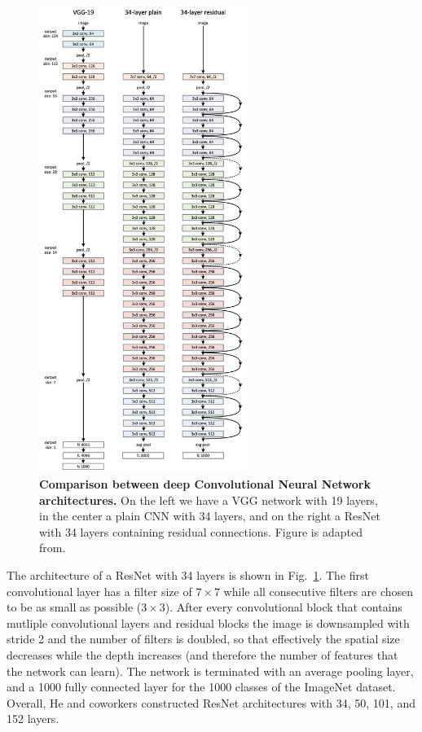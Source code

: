 \begin{figure}[h!]
	\centering
	\captionsetup{width=1\linewidth}
	\includegraphics[width=0.6\textwidth]{Figures/resnet_architecture.png}
	\caption{\textbf{Comparison between deep Convolutional Neural Network architectures.} On the left we have a VGG network with 19 layers, in the center a plain CNN with 34 layers, and on the right a ResNet with 34 layers containing residual connections. Figure is adapted from\parencite{he2015}.}
	\label{fig:resnet}
\end{figure}

The architecture of a ResNet with 34 layers is shown in Fig.~\ref{fig:resnet}. The first convolutional layer has a filter size of $7\times7$ while all consecutive filters are chosen to be as small as possible ($3\times3$). After every convolutional block that contains mutliple convolutional layers and residual blocks the image is downsampled with stride 2 and the number of filters is doubled, so that effectively the spatial size decreases while the depth increases (and therefore the number of features that the network can learn). The network is terminated with an average pooling layer, and a 1000 fully connected layer for the 1000 classes of the ImageNet dataset. Overall, He and coworkers constructed ResNet architectures with 34, 50, 101, and 152 layers.

